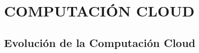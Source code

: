 \documentclass[a4paper, 12pt]{report}
\begin{document}
\doublespacing
\vspace*{5em}

\chapter{COMPUTACI\'ON CLOUD}\label{cap1}
\pagestyle{plain}
\vspace*{-2em}
\begin{justify}
\end{justify}
\section{Evoluci\'on de la Computaci\'on Cloud}
\end{document}
